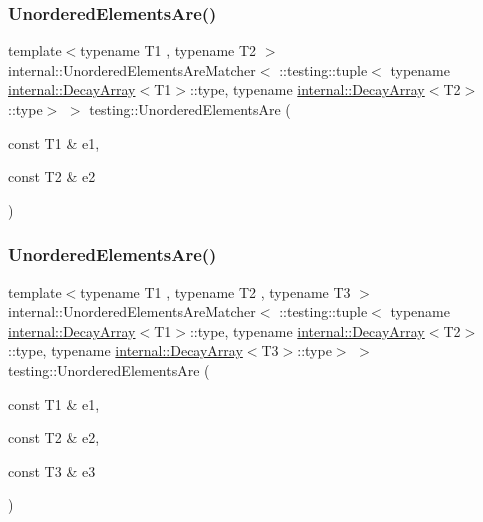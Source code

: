 \mbox{\label{namespacetesting_aedcecfa2107e03f5e2837f7124f73a87}} 
\subsubsection{\texorpdfstring{UnorderedElementsAre()}{UnorderedElementsAre()}\hspace{0.1cm}{\footnotesize\ttfamily [3/11]}}
{\footnotesize\ttfamily template$<$typename T1 , typename T2 $>$ \\
internal\+::\+Unordered\+Elements\+Are\+Matcher$<$ \+::testing\+::tuple$<$ typename \mbox{\hyperlink{structtesting_1_1internal_1_1DecayArray}{internal\+::\+Decay\+Array}}$<$T1$>$\+::type, typename \mbox{\hyperlink{structtesting_1_1internal_1_1DecayArray}{internal\+::\+Decay\+Array}}$<$T2$>$\+::type$>$ $>$ testing\+::\+Unordered\+Elements\+Are (\begin{DoxyParamCaption}\item[{const T1 \&}]{e1,  }\item[{const T2 \&}]{e2 }\end{DoxyParamCaption})\hspace{0.3cm}{\ttfamily [inline]}}

\mbox{\label{namespacetesting_aec0f9ede2dc05de791c61eae0504a757}} 
\subsubsection{\texorpdfstring{UnorderedElementsAre()}{UnorderedElementsAre()}\hspace{0.1cm}{\footnotesize\ttfamily [4/11]}}
{\footnotesize\ttfamily template$<$typename T1 , typename T2 , typename T3 $>$ \\
internal\+::\+Unordered\+Elements\+Are\+Matcher$<$ \+::testing\+::tuple$<$ typename \mbox{\hyperlink{structtesting_1_1internal_1_1DecayArray}{internal\+::\+Decay\+Array}}$<$T1$>$\+::type, typename \mbox{\hyperlink{structtesting_1_1internal_1_1DecayArray}{internal\+::\+Decay\+Array}}$<$T2$>$\+::type, typename \mbox{\hyperlink{structtesting_1_1internal_1_1DecayArray}{internal\+::\+Decay\+Array}}$<$T3$>$\+::type$>$ $>$ testing\+::\+Unordered\+Elements\+Are (\begin{DoxyParamCaption}\item[{const T1 \&}]{e1,  }\item[{const T2 \&}]{e2,  }\item[{const T3 \&}]{e3 }\end{DoxyParamCaption})\hspace{0.3cm}{\ttfamily [inline]}}

